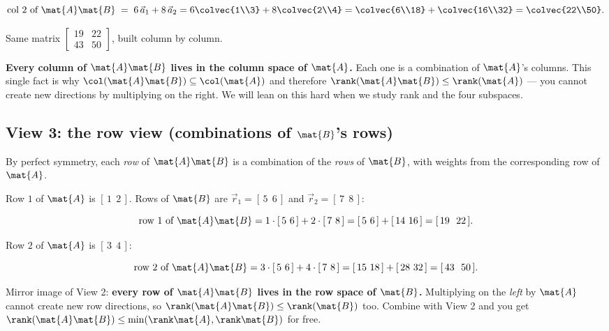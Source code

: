 \[
\text{col 2 of } \mat{A}\mat{B} \;=\; 6\,\vec{a}_1 + 8\,\vec{a}_2
= 6\colvec{1\\3} + 8\colvec{2\\4}
= \colvec{6\\18} + \colvec{16\\32} = \colvec{22\\50}.
\]

Same matrix $\begin{bmatrix}19 & 22\\ 43 & 50\end{bmatrix}$, built column by column.

\begin{focusbox}
\textbf{Every column of $\mat{A}\mat{B}$ lives in the column space of $\mat{A}$.}
Each one is a combination of $\mat{A}$'s columns. This single fact is why
$\col(\mat{A}\mat{B}) \subseteq \col(\mat{A})$ and therefore
$\rank(\mat{A}\mat{B}) \le \rank(\mat{A})$ --- you cannot create new directions by
multiplying on the right. We will lean on this hard when we study rank and the four
subspaces.
\end{focusbox}

\subsection{View 3: the row view (combinations of $\mat{B}$'s rows)}

By perfect symmetry, each \emph{row} of $\mat{A}\mat{B}$ is a combination of the
\emph{rows} of $\mat{B}$, with weights from the corresponding row of $\mat{A}$.

Row $1$ of $\mat{A}$ is $[\,1 \ \ 2\,]$. Rows of $\mat{B}$ are
$\vec{r}_1 = [\,5 \ \ 6\,]$ and $\vec{r}_2 = [\,7 \ \ 8\,]$:

\[
\text{row 1 of } \mat{A}\mat{B} = 1\cdot[\,5 \ 6\,] + 2\cdot[\,7\ 8\,]
= [\,5\ 6\,] + [\,14\ 16\,] = [\,19\ \ 22\,].
\]

Row $2$ of $\mat{A}$ is $[\,3\ \ 4\,]$:

\[
\text{row 2 of } \mat{A}\mat{B} = 3\cdot[\,5\ 6\,] + 4\cdot[\,7\ 8\,]
= [\,15\ 18\,] + [\,28\ 32\,] = [\,43\ \ 50\,].
\]

\begin{focusbox}
Mirror image of View 2: \textbf{every row of $\mat{A}\mat{B}$ lives in the row space
of $\mat{B}$.} Multiplying on the \emph{left} by $\mat{A}$ cannot create new row
directions, so $\rank(\mat{A}\mat{B}) \le \rank(\mat{B})$ too. Combine with View 2 and
you get $\rank(\mat{A}\mat{B}) \le \min(\rank \mat{A}, \rank \mat{B})$ for free.
\end{focusbox}

